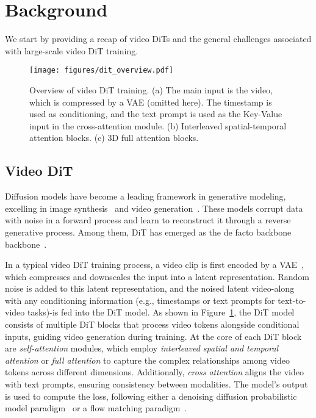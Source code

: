 \section{Background }
\label{sec:Background}

We start by providing a recap of video DiTs and the general challenges associated with large-scale video DiT training. 

\begin{figure}[t]
  \centering
  \texttt{[image: figures/dit\_overview.pdf]}

\caption{Overview of video DiT training. (a) The main input is the video, which is compressed by a VAE (omitted here). The timestamp is used as conditioning, and the text prompt is used as the Key-Value input in the cross-attention module. (b) Interleaved spatial-temporal attention blocks. (c) 3D full attention blocks.}
\label{fig:dit_overview} 
\end{figure}


\subsection{Video DiT} 
\label{sec:video_dit}
Diffusion models have become a leading framework in generative modeling, excelling in image synthesis~\cite{esser2024stablediff3,chen2023pixart} and video generation~\cite{peebles2023scalableDiT,ma2024latte,klingvideo,HunyuanVideo,bao2024vidu,polyak2024movie}. These models corrupt data with noise in a forward process and learn to reconstruct it through a reverse generative process. Among them, DiT has emerged as the de facto backbone backbone~\cite{peebles2023scalableDiT,ma2024latte,OpenSora}.


In a typical video DiT training process, a video clip is first encoded by a VAE~\cite{stabilityai_stable_diffusion,peebles2023scalableDiT,OpenSora}, which compresses and downscales the input into a latent representation. Random noise is added to this latent representation, and the noised latent video-along with any conditioning information (e.g., timestamps or text prompts for text-to-video tasks)-is fed into the DiT model. 
As shown in Figure~\ref{fig:dit_overview}, the DiT model consists of multiple DiT blocks that process video tokens alongside conditional inputs, guiding video generation during training.
At the core of each DiT block are \textit{self-attention} modules, which employ \textit{interleaved spatial and temporal attention} or \textit{full attention} to capture the complex relationships among video tokens across different dimensions. Additionally, \textit{cross attention} aligns the video with text prompts, ensuring consistency between modalities. The model's output is used to compute the loss, following either a denoising diffusion probabilistic model paradigm~\cite{ho2020denoisingddpm} or a flow matching paradigm~\cite{lipman2022flowmatching,ma2024sit}.



